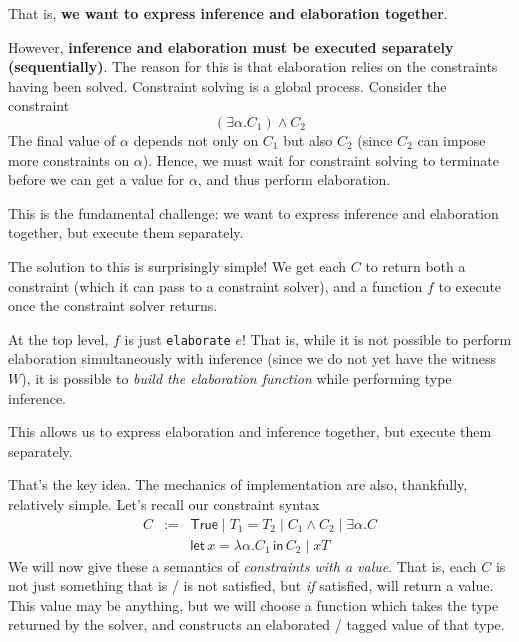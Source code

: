{That is, \textbf{we want to express inference and elaboration together}. 

However, \textbf{inference and elaboration must be executed separately (sequentially)}. The reason for this is that elaboration relies on the constraints having been solved. Constraint solving is a global process. Consider the constraint 
\[(\exists \alpha. C_1) \land C_2\]
The final value of $\alpha$ depends not only on $C_1$ but also $C_2$ (since $C_2$ can impose more constraints on $\alpha$). Hence, we must wait for constraint solving to terminate before we can get a value for $\alpha$, and thus perform elaboration.

This is the fundamental challenge: we want to express inference and elaboration together, but execute them separately.

The solution to this is surprisingly simple! We get each $C$ to return both a constraint (which it can pass to a constraint solver), and a function $f$ to execute once the constraint solver returns. 

At the top level, $f$ is just \texttt{elaborate} $e$! That is, while it is not possible to perform elaboration simultaneously with inference (since we do not yet have the witness $W$), it is possible to \textit{build the elaboration function} while performing type inference.

This allows us to express elaboration and inference together, but execute them separately. 

That's the key idea. The mechanics of implementation are also, thankfully, relatively simple. Let's recall our constraint syntax
\[\begin{array}{lcl}
     C&:=&\textsf{True} \mid T_1 = T_2 \mid C_1 \land C_2 \mid \exists \alpha . C \\
        &&\textsf{let}\, x = \lambda \alpha . C_1 \, \textsf{in} \, C_2 \mid x T
     \end{array}
\]
We will now give these a semantics of \textit{constraints with a value}. That is, each $C$ is not just something that is / is not satisfied, but \textit{if} satisfied, will return a value. This value may be anything, but we will choose a function which takes the type returned by the solver, and constructs an elaborated / tagged value of that type. 

}

